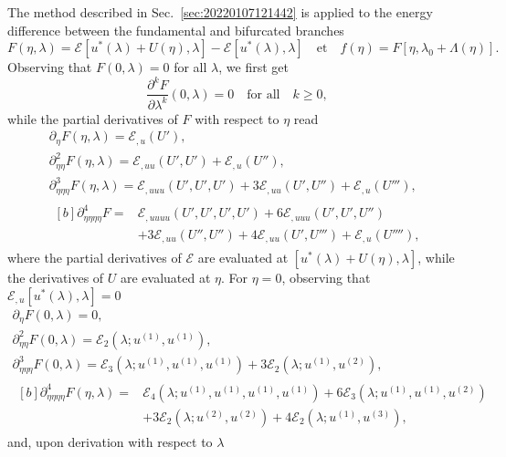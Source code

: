 \documentclass[12pt, final]{scrartcl}
\theoremstyle{definition}
\newcommand{\E}{\mathcal E}
\newcommand{\order}[2][1]{#2^{(#1)}}
\begin{document}
The method described in Sec.~\ref{sec:20220107121442} is applied to the energy
difference between the fundamental and bifurcated branches
\begin{equation}
  F(η, \lambda) = \E[u^{\ast}(\lambda) + U(η), \lambda] - \E[u^{\ast}(\lambda), \lambda]
  \quad \text{et} \quad
  f(η) = F [η, \lambda_0 + \Lambda(η)].
\end{equation}
Observing that $F(0, \lambda) = 0$ for all $\lambda$, we first get
\begin{equation*}
  \frac{∂^k F}{∂ \lambda^k}(0, \lambda) = 0 \quad \text{for all} \quad k ≥ 0,
\end{equation*}
while the partial derivatives of $F$ with respect to $η$ read
\begin{gather*}
  ∂_{η} F(η, \lambda) = \E_{, u}(U'),\\
  ∂_{ηη}^2 F(η, \lambda) = \E_{, uu} (U', U') + \E_{, u} (U''),\\
  ∂_{ηηη}^3 F(η, \lambda) = \E_{, uuu}(U', U', U') + 3\E_{, uu}(U', U'') + \E_{, u}(U'''),\\
  \begin{aligned}[b]
    ∂_{ηηηη}^4 F ={}
    & \E_{, uuuu}(U', U', U', U') + 6\E_{,uuu}(U', U', U'')\\
    & + 3\E_{, uu}(U'', U'') + 4\E_{, uu}(U', U''') + \E_{, u}(U''''),
  \end{aligned}
\end{gather*}
where the partial derivatives of $\E$ are evaluated at
$[u^{\ast}(\lambda) + U(η), \lambda]$, while the derivatives of $U$ are evaluated at
$η$. For $η = 0$, observing that $\E_{, u}[u^{\ast}(\lambda), \lambda] = 0$
\begin{gather*}
  ∂_{η} F(0, \lambda) = 0,\\
  ∂_{ηη}^2 F(0, \lambda) =\E_2(\lambda ; \order[1]u, \order[1]u),\\
  ∂_{ηηη}^3 F(0, \lambda) = \E_3(\lambda; \order[1]u, \order[1]u, \order[1]u) + 3\E_2(\lambda; \order[1]u, \order[2]u),\\
  \begin{aligned}[b]
    ∂_{ηηηη}^4 F(η, \lambda) ={} & \E_4(\lambda; \order[1]u, \order[1]u, \order[1]u, \order[1]u) + 6\E_3(\lambda; \order[1]u, \order[1]u, \order[2]u)\\
    & + 3\E_2(\lambda; \order[2]u, \order[2]u) + 4\E_2(\lambda; \order[1]u, \order[3]u),
  \end{aligned}
\end{gather*}
and, upon derivation with respect to $\lambda$
\end{document}
